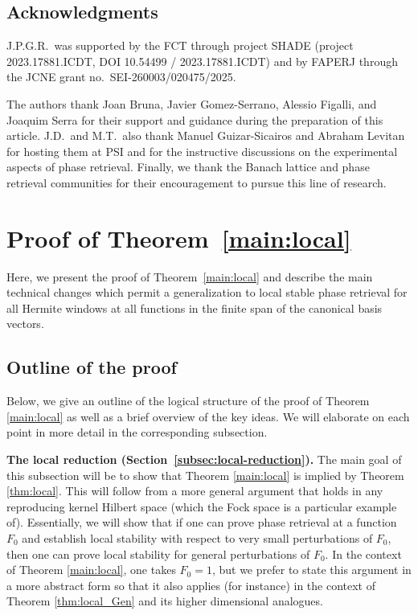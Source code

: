 \documentclass[11pt]{amsart}
\theoremstyle{remark}
\begin{document}
\subsection{Acknowledgments}
J.P.G.R.~was supported by the FCT through project SHADE (project 2023.17881.ICDT, DOI  10.54499 / 2023.17881.ICDT) and by FAPERJ through the JCNE grant no.~SEI-260003/020475/2025.
\medskip

The authors thank Joan Bruna, Javier Gomez-Serrano, Alessio Figalli, and Joaquim Serra for their support and guidance during the preparation of this article. J.D.~and M.T.~also thank Manuel Guizar-Sicairos and Abraham Levitan for hosting them at PSI and for the instructive discussions on the experimental aspects of phase retrieval. Finally, we thank the Banach lattice and phase retrieval communities for their encouragement to pursue this line of research.

\section{Proof of Theorem~\ref{main:local}}
Here, we present the proof of Theorem~\ref{main:local} and describe the main technical changes which permit a generalization to local stable phase retrieval for all Hermite windows at all functions in the finite span of the canonical basis vectors. 

\subsection{Outline of the proof}\label{sec:strategy}
Below, we give an outline of the logical structure of the proof of Theorem \ref{main:local} as well as a brief overview of the key ideas. We will elaborate on each point in more detail in the corresponding subsection. 
\medskip

\noindent\textbf{The local reduction
(Section~\ref{subsec:local-reduction}).}\;
The main goal of this subsection will be to show that Theorem \ref{main:local} is implied by Theorem \ref{thm:local}. This will follow from a more general argument that holds in any reproducing kernel Hilbert space (which the Fock space is a particular example of). Essentially, we will show that if one
can prove phase retrieval at a function \(F_0\) and establish local stability
with respect to very small perturbations of \(F_0\), then one can prove local
stability for general perturbations of \(F_0\). In the context of Theorem \ref{main:local}, one takes $F_0=1$, but we prefer to state this argument in a more abstract form so that it also applies (for instance) in the context of Theorem \ref{thm:local_Gen} and its higher dimensional analogues. 
\medskip
\end{document}
